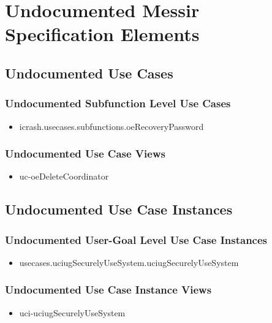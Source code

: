 	
\chapter{Undocumented Messir Specification Elements}


\section[Undocumented Use Cases]{Undocumented Use Cases}



\subsection[Undocumented Use Cases - Subfunction Level]{Undocumented Subfunction Level Use Cases}
\begin{itemize}
\item icrash.usecases.subfunctions.oeRecoveryPassword 
\end{itemize}

\subsection[Undocumented Use Case Views]{Undocumented Use Case Views}
\begin{itemize}
\item uc-oeDeleteCoordinator 
\end{itemize}




\section[Undocumented Use Case Instances]{Undocumented Use Case Instances}


\subsection[Undocumented Use Case Instances - User-Goal Level]{Undocumented User-Goal Level Use Case Instances}
\begin{itemize}
\item usecases.uciugSecurelyUseSystem.uciugSecurelyUseSystem 
\end{itemize}


\subsection[Undocumented Use Case Instance Views]{Undocumented Use Case Instance Views}
\begin{itemize}
\item uci-uciugSecurelyUseSystem 
\end{itemize}






